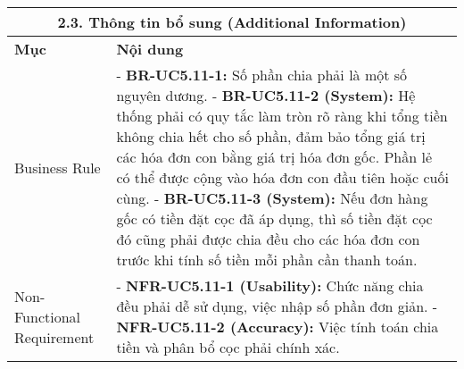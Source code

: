 \begin{longtable}{|m{4cm}|p{11cm}|}
\hline
\multicolumn{2}{|c|}{\textbf{2.3. Thông tin bổ sung (Additional Information)}} \\
\hline
\textbf{Mục} & \textbf{Nội dung} \\
\hline
Business Rule & - \textbf{BR-UC5.11-1:} Số phần chia phải là một số nguyên dương. \newline - \textbf{BR-UC5.11-2 (System):} Hệ thống phải có quy tắc làm tròn rõ ràng khi tổng tiền không chia hết cho số phần, đảm bảo tổng giá trị các hóa đơn con bằng giá trị hóa đơn gốc. Phần lẻ có thể được cộng vào hóa đơn con đầu tiên hoặc cuối cùng. \newline - \textbf{BR-UC5.11-3 (System):} Nếu đơn hàng gốc có tiền đặt cọc đã áp dụng, thì số tiền đặt cọc đó cũng phải được chia đều cho các hóa đơn con trước khi tính số tiền mỗi phần cần thanh toán. \\
\hline
Non-Functional Requirement & - \textbf{NFR-UC5.11-1 (Usability):} Chức năng chia đều phải dễ sử dụng, việc nhập số phần đơn giản. \newline - \textbf{NFR-UC5.11-2 (Accuracy):} Việc tính toán chia tiền và phân bổ cọc phải chính xác. \\
\hline
\end{longtable}

